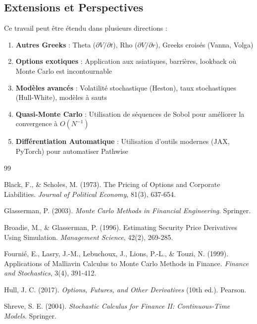 \documentclass[a4paper,11pt]{article}
\theoremstyle{definition}
\begin{document}
\subsection{Extensions et Perspectives}

Ce travail peut être étendu dans plusieurs directions :

\begin{enumerate}
    \item \textbf{Autres Greeks} : Theta ($\partial V/\partial t$), Rho ($\partial V/\partial r$), Greeks croisés (Vanna, Volga)
    
    \item \textbf{Options exotiques} : Application aux asiatiques, barrières, lookback où Monte Carlo est incontournable
    
    \item \textbf{Modèles avancés} : Volatilité stochastique (Heston), taux stochastiques (Hull-White), modèles à sauts
    
    \item \textbf{Quasi-Monte Carlo} : Utilisation de séquences de Sobol pour améliorer la convergence à $O(N^{-1})$
    
    \item \textbf{Différentiation Automatique} : Utilisation d'outils modernes (JAX, PyTorch) pour automatiser Pathwise
\end{enumerate}

\newpage
\begin{thebibliography}{99}

Black, F., \& Scholes, M. (1973). The Pricing of Options and Corporate Liabilities. \textit{Journal of Political Economy}, 81(3), 637-654.

Glasserman, P. (2003). \textit{Monte Carlo Methods in Financial Engineering}. Springer.

Broadie, M., \& Glasserman, P. (1996). Estimating Security Price Derivatives Using Simulation. \textit{Management Science}, 42(2), 269-285.

Fournié, E., Lasry, J.-M., Lebuchoux, J., Lions, P.-L., \& Touzi, N. (1999). Applications of Malliavin Calculus to Monte Carlo Methods in Finance. \textit{Finance and Stochastics}, 3(4), 391-412.

Hull, J. C. (2017). \textit{Options, Futures, and Other Derivatives} (10th ed.). Pearson.

Shreve, S. E. (2004). \textit{Stochastic Calculus for Finance II: Continuous-Time Models}. Springer.

\end{thebibliography}
\end{document}

